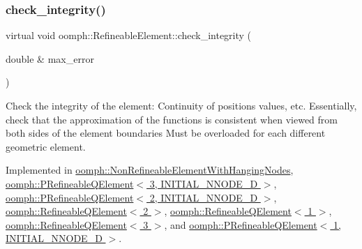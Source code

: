 \mbox{\label{classoomph_1_1RefineableElement_ae665f2d2eb0b6410ddcb101caa80922a}} 
\subsubsection{\texorpdfstring{check\+\_\+integrity()}{check\_integrity()}}
{\footnotesize\ttfamily virtual void oomph\+::\+Refineable\+Element\+::check\+\_\+integrity (\begin{DoxyParamCaption}\item[{double \&}]{max\+\_\+error }\end{DoxyParamCaption})\hspace{0.3cm}{\ttfamily [pure virtual]}}



Check the integrity of the element\+: Continuity of positions values, etc. Essentially, check that the approximation of the functions is consistent when viewed from both sides of the element boundaries Must be overloaded for each different geometric element. 



Implemented in \hyperlink{classoomph_1_1NonRefineableElementWithHangingNodes_a68766070804623a8575bc4be86325fa3}{oomph\+::\+Non\+Refineable\+Element\+With\+Hanging\+Nodes}, \hyperlink{classoomph_1_1PRefineableQElement_3_013_00_01INITIAL__NNODE__1D_01_4_af7340470f3d3734c7a327119d4a88fc4}{oomph\+::\+P\+Refineable\+Q\+Element$<$ 3, I\+N\+I\+T\+I\+A\+L\+\_\+\+N\+N\+O\+D\+E\+\_\+D $>$}, \hyperlink{classoomph_1_1PRefineableQElement_3_012_00_01INITIAL__NNODE__1D_01_4_a1ceeaf2697c7924870a7e606240ada38}{oomph\+::\+P\+Refineable\+Q\+Element$<$ 2, I\+N\+I\+T\+I\+A\+L\+\_\+\+N\+N\+O\+D\+E\+\_\+D $>$}, \hyperlink{classoomph_1_1RefineableQElement_3_012_01_4_a8f06b44d8fc378c3a3e256c9181e6b50}{oomph\+::\+Refineable\+Q\+Element$<$ 2 $>$}, \hyperlink{classoomph_1_1RefineableQElement_3_011_01_4_a64d91c3deb6f1c7532b77f9e673bb150}{oomph\+::\+Refineable\+Q\+Element$<$ 1 $>$}, \hyperlink{classoomph_1_1RefineableQElement_3_013_01_4_ac956bd05c434861ba65b0431024c1072}{oomph\+::\+Refineable\+Q\+Element$<$ 3 $>$}, and \hyperlink{classoomph_1_1PRefineableQElement_3_011_00_01INITIAL__NNODE__1D_01_4_a639085069bcf2e9415c28385880bd2bd}{oomph\+::\+P\+Refineable\+Q\+Element$<$ 1, I\+N\+I\+T\+I\+A\+L\+\_\+\+N\+N\+O\+D\+E\+\_\+D $>$}.



